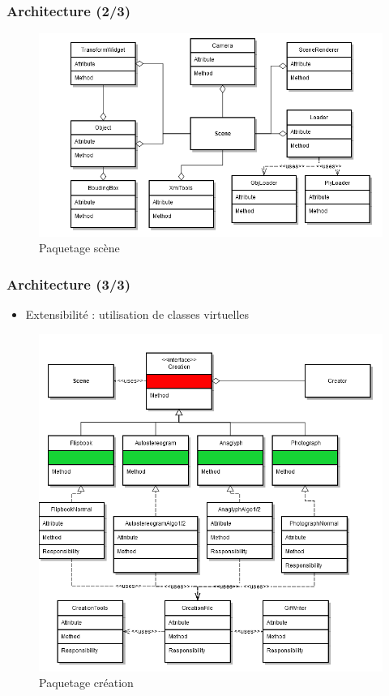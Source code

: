 \documentclass{beamer}
\begin{document}
\begin{frame}
\frametitle{Architecture (2/3)}
\centering
\begin{figure}
  \includegraphics[scale=0.4]{scene.png}
  \caption{Paquetage scène}
\end{figure}
\end{frame}

% 

\begin{frame}
\frametitle{Architecture (3/3)}
\begin{itemize}[label=$\bullet$]
\item Extensibilité : utilisation de classes virtuelles
\end{itemize}
\centering
\begin{figure}
  \includegraphics[scale=0.25]{extensibilite.png}
  \caption{Paquetage création}
\end{figure}
\end{frame}
\end{document}
